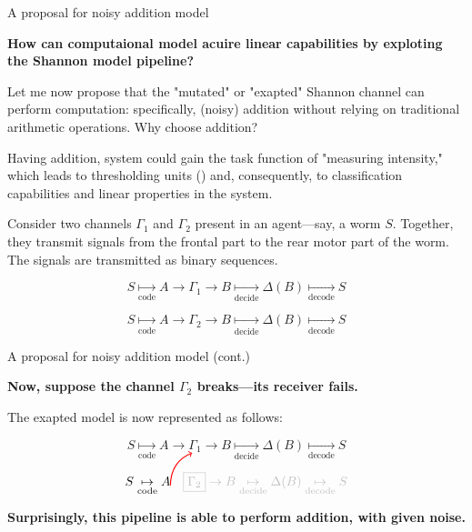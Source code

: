 \documentclass[10pt, aspectratio=169]{beamer}
\begin{document}
\begin{frame}{A proposal for noisy addition model }
   
\textbf{How can computaional model acuire linear capabilities by exploting the Shannon model pipeline?}
    
Let me now propose that the "mutated" or "exapted" Shannon channel can perform computation: specifically, (noisy) addition without relying on traditional arithmetic operations. Why choose addition? 

Having addition, system could gain the task function of "measuring intensity," which leads to thresholding units (\cite{mcculloch_logical_1943}) and, consequently, to classification capabilities and linear properties in the system.

Consider two channels \(\Gamma_1\) and \(\Gamma_2\) present in an agent—say, a worm \(S\). Together, they transmit signals from the frontal part to the rear motor part of the worm. The signals are transmitted as binary sequences.


\[
S \underset{\text{code}}{\mapsto} A \rightarrow \boxed{\Gamma_1} \rightarrow B \underset{\text{decide}}{\mapsto} \Delta(B) \underset{\text{decode}}{\mapsto} S
\]

\[
S \underset{\text{code}}{\mapsto} A \rightarrow \boxed{\Gamma_2} \rightarrow B \underset{\text{decide}}{\mapsto} \Delta(B) \underset{\text{decode}}{\mapsto} S
\]

\end{frame}

\begin{frame}{A proposal for noisy addition model (cont.) }

\textbf{Now, suppose the channel \(\Gamma_2\) breaks—its receiver fails.} 

The exapted model is now represented as follows:

\[
S \underset{\text{code}}{\mapsto} A \rightarrow \boxed{\Gamma_1} \rightarrow B \underset{\text{decide}}{\mapsto} \Delta(B) \underset{\text{decode}}{\mapsto} S
\]

\[
S \underset{\text{code}}{\mapsto} 
A 
\begin{tikzpicture}[overlay, remember picture]
    \draw[->, red, thick] (0,0) to[out=90,in=200] (0.6,0.9);
\end{tikzpicture}
\textcolor{white}{\rightarrow }
\textcolor{lightgray}{\boxed{\Gamma_2} \rightarrow B \underset{\text{decide}}{\mapsto} \Delta(B) \underset{\text{decode}}{\mapsto} S}
\]

\textbf{Surprisingly, this pipeline is able to perform addition, with given noise. }

\end{frame}
\end{document}
